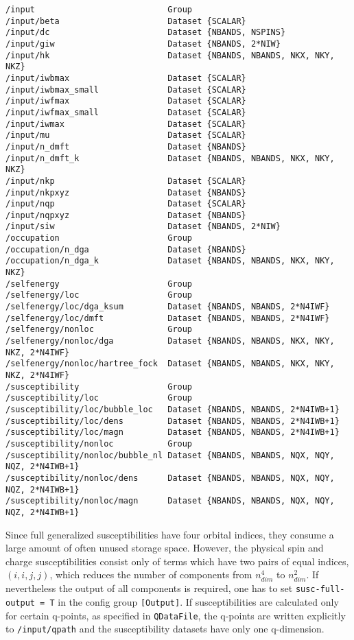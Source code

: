 \documentclass[a4paper,11pt]{article}
\numberwithin{equation}{section} %
\begin{document}
\begin{lstlisting}[caption=ADGA output format, frame=single, basicstyle=\small]
/input                           Group
/input/beta                      Dataset {SCALAR}
/input/dc                        Dataset {NBANDS, NSPINS}
/input/giw                       Dataset {NBANDS, 2*NIW}
/input/hk                        Dataset {NBANDS, NBANDS, NKX, NKY, NKZ}
/input/iwbmax                    Dataset {SCALAR}
/input/iwbmax_small              Dataset {SCALAR}
/input/iwfmax                    Dataset {SCALAR}
/input/iwfmax_small              Dataset {SCALAR}
/input/iwmax                     Dataset {SCALAR}
/input/mu                        Dataset {SCALAR}
/input/n_dmft                    Dataset {NBANDS}
/input/n_dmft_k                  Dataset {NBANDS, NBANDS, NKX, NKY, NKZ}
/input/nkp                       Dataset {SCALAR}
/input/nkpxyz                    Dataset {NBANDS}
/input/nqp                       Dataset {SCALAR}
/input/nqpxyz                    Dataset {NBANDS}
/input/siw                       Dataset {NBANDS, 2*NIW}
/occupation                      Group
/occupation/n_dga                Dataset {NBANDS}
/occupation/n_dga_k              Dataset {NBANDS, NBANDS, NKX, NKY, NKZ}
/selfenergy                      Group
/selfenergy/loc                  Group
/selfenergy/loc/dga_ksum         Dataset {NBANDS, NBANDS, 2*N4IWF}
/selfenergy/loc/dmft             Dataset {NBANDS, NBANDS, 2*N4IWF}
/selfenergy/nonloc               Group
/selfenergy/nonloc/dga           Dataset {NBANDS, NBANDS, NKX, NKY, NKZ, 2*N4IWF}
/selfenergy/nonloc/hartree_fock  Dataset {NBANDS, NBANDS, NKX, NKY, NKZ, 2*N4IWF}
/susceptibility                  Group
/susceptibility/loc              Group
/susceptibility/loc/bubble_loc   Dataset {NBANDS, NBANDS, 2*N4IWB+1}
/susceptibility/loc/dens         Dataset {NBANDS, NBANDS, 2*N4IWB+1}
/susceptibility/loc/magn         Dataset {NBANDS, NBANDS, 2*N4IWB+1}
/susceptibility/nonloc           Group
/susceptibility/nonloc/bubble_nl Dataset {NBANDS, NBANDS, NQX, NQY, NQZ, 2*N4IWB+1}
/susceptibility/nonloc/dens      Dataset {NBANDS, NBANDS, NQX, NQY, NQZ, 2*N4IWB+1}
/susceptibility/nonloc/magn      Dataset {NBANDS, NBANDS, NQX, NQY, NQZ, 2*N4IWB+1}
\end{lstlisting}

\newpage
Since full generalized susceptibilities have four orbital indices, they consume a large amount of often unused storage space. However, the physical spin and charge susceptibilities
consist only of terms which have two pairs of equal indices, $(i,i,j,j)$, which reduces the number of components from $n_{dim}^4$ to $n_{dim}^2$.
If nevertheless the output of all components is required, 
one has to set \verb|susc-full-output = T| in the config group {\color{red}\verb|[Output]|}.
If susceptibilities are calculated only for certain q-points, as specified in \verb|QDataFile|, the q-points are
written explicitly to \verb|/input/qpath| and the susceptibility datasets have only one q-dimension. 
\end{document}
